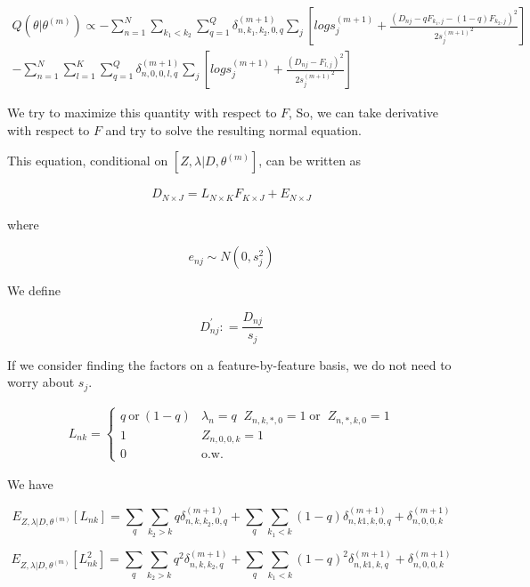 \documentclass[12pt]{article}
\begin{document}
\begin{eqnarray}
 Q (\theta | \theta^{(m)}) \propto - \sum_{n=1}^{N} \sum_{k_1 < k_2} \sum_{q=1}^{Q} \delta^{(m+1)}_{n, k_1, k_2, 0, q}  \sum_{j} \left [ log s^{(m+1)}_{j} + \frac{(D_{nj} - q F_{k_1,j} - (1-q) F_{k_2,j})^2}{2{s_j^{(m+1)}}^2} \right] \\
 -   \sum_{n=1}^{N} \sum_{l=1}^{K} \sum_{q=1}^{Q} \delta^{(m+1)}_{n, 0, 0, l, q}  \sum_{j} \left [ log s^{(m+1)}_{j} + \frac{(D_{nj} - F_{l,j})^2}{2{s_j^{(m+1)}}^2} \right] 
\end{eqnarray}

We try to maximize this quantity with respect to $F$, So, we can take derivative with respect to $F$ and try to solve the resulting normal equation.

This equation, conditional on $\left [ Z, \lambda | D, \theta^{(m)} \right ]$, can be written as 

\begin{eqnarray}
 D_{N \times J} = L_{N \times K} F_{K \times J} + E_{N \times J}
\end{eqnarray}

where 

$$ e_{nj} \sim N(0, s^2_{j}) $$

We define 

$$ D^{'}_{nj} : = \frac{D_{nj}}{s_{j}} $$

If we consider finding the factors on a feature-by-feature basis, we do not need to worry about $s_j$.

\begin{align*}
L_{nk} =
\begin{cases}
    q~\text{or}~(1-q) & \lambda_{n}=q  \; \; Z_{n,k,*, 0}=1 \; \text{or} \;\; Z_{n, *, k, 0} = 1 \\
    1 & Z_{n,0,0,k}=1 \\
    0 & \text{o.w.}
\end{cases}
\end{align*}

We have 

$$ E_{ Z, \lambda | D, \theta^{(m)}} \left [ L_{nk} \right ] = \sum_{q}  \sum_{k_2 > k} q \delta^{(m+1)}_{n, k, k_2, 0, q}  + \sum_{q}  \sum_{k_1 < k} (1-q) \delta^{(m+1)}_{n, k1, k, 0, q} +  \delta^{(m+1)}_{n, 0, 0, k} $$

$$ E_{ Z, \lambda | D, \theta^{(m)}} \left [ L^2_{nk} \right ] = \sum_{q}  \sum_{k_2 > k} q^2 \delta^{(m+1)}_{n,k,k_2, q}  + \sum_{q}  \sum_{k_1 < k} (1-q)^2 \delta^{(m+1)}_{n,k1,k,q} +  \delta^{(m+1)}_{n, 0, 0, k} $$
\end{document}
